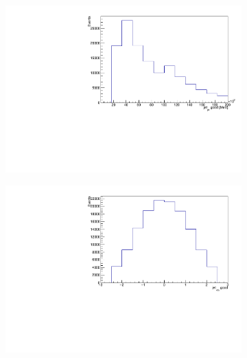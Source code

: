 \begin{figure}
  \begin{subfigure}{0.5\textwidth}
    \centering
    \includegraphics[width=\linewidth]{plots_and_txt/ttbar.mu_selected_/ttbar.mu_selected_jet_pt_good.pdf}
    \caption{}
    \label{fig:lep_pt3}
  \end{subfigure}%
  \begin{subfigure}{0.5\textwidth}
    \centering
    \includegraphics[width=\linewidth]{plots_and_txt/ttbar.mu_selected_/ttbar.mu_selected_jet_eta_good.pdf}
    \caption{}
    \label{fig:btagged3}
  \end{subfigure}%
  \newline
  \begin{subfigure}{0.5\textwidth}
    \centering

\end{subfigure}
\end{figure}
